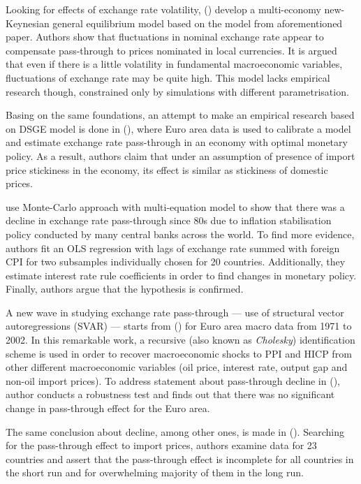 \documentclass[12pt, a4paper]{extarticle}
\begin{document}
Looking for effects of exchange rate volatility, (\cite{Devereux2002}) develop a multi-economy new-Keynesian general equilibrium model based on the model from aforementioned paper. Authors show that fluctuations in nominal exchange rate appear to compensate pass-through to prices nominated in local currencies. It is argued that even if there is a little volatility in fundamental macroeconomic variables, fluctuations of exchange rate may be quite high. This model lacks empirical research though, constrained only by simulations with different parametrisation.

Basing on the same foundations, an attempt to make an empirical research based on DSGE model is done in (\cite{Smets2002}), where Euro area data is used to calibrate a model and estimate exchange rate pass-through in an economy with optimal monetary policy. As a result, authors claim that under an assumption of presence of import price stickiness in the economy, its effect is similar as stickiness of domestic prices.

\textcite{Gagnon2004} use Monte-Carlo approach with multi-equation model to show that there was a decline in exchange rate pass-through since 80s due to inflation stabilisation policy conducted by many central banks across the world. To find more evidence, authors fit an OLS regression with lags of exchange rate summed with foreign CPI for two subsamples individually chosen for 20 countries. Additionally, they estimate interest rate rule coefficients in order to find changes in monetary policy. Finally, authors argue that the hypothesis is confirmed.

A new wave in studying exchange rate pass-through --- use of structural vector autoregressions (SVAR) --- starts from (\cite{Hahn2003}) for Euro area macro data from 1971 to 2002. In this remarkable work, a recursive (also known as \textit{Cholesky}) identification scheme is used in order to recover macroeconomic shocks to PPI and HICP from other different macroeconomic variables (oil price, interest rate, output gap and non-oil import prices). To address statement about pass-through decline in (\cite{Gagnon2004}), author conducts a robustness test and finds out that there was no significant change in pass-through effect for the Euro area.

The same conclusion about decline, among other ones, is made in (\cite{Campa2005}). Searching for the pass-through effect to import prices, authors examine data for 23 countries and assert that the pass-through effect is incomplete for all countries in the short run and for overwhelming majority of them in the long run.
\end{document}
